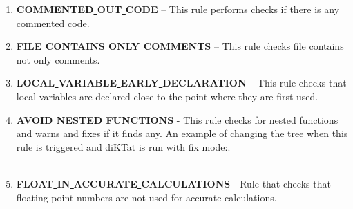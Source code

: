 \begin{enumerate}
    \item \textbf{COMMENTED\underline{ }OUT\underline{ }CODE} – This rule performs checks if there is any commented code.
    \item \textbf{FILE\underline{ }CONTAINS\underline{ }ONLY\underline{ }COMMENTS} – This rule checks file contains not only comments.
    \item \textbf{LOCAL\underline{ }VARIABLE\underline{ }EARLY\underline{ }DECLARATION} – This rule checks that local variables are declared close to the point where they are first used.
    \item \textbf{AVOID\underline{ }NESTED\underline{ }FUNCTIONS} - This rule checks for nested functions and warns and fixes if it finds any.
    An example of changing the tree when this rule is triggered and diKTat is run with fix mode:.\\\\
    \item \textbf{FLOAT\underline{ }IN\underline{ }ACCURATE\underline{ }CALCULATIONS} - Rule that checks that floating-point numbers are not used for accurate calculations.
\end{enumerate}
